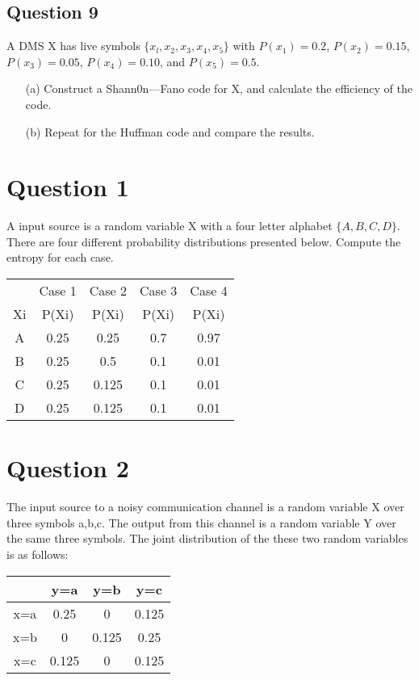 \documentclass[a4paper,12pt]{article}
\begin{document}
\subsection*{Question 9}
A DMS X has live symbols $\{x_l,x_2,x_3,x_4,x_5\}$ with $P(x_1) = 0.2$, $P(x_2)=0.15$, $P(x_3) =0.05$,
$P(x_4) = 0.10$, and $P(x_5) = 0.5$. 
\begin{itemize}
\item[(a)] Construct a Shann0n—Fano code for X, and calculate the efficiency of the code.
\item[(b)] Repeat for the Huffman code and compare the results.
\end{itemize}

 

\section*{Question 1}

A input source is a random variable X with a four letter alphabet $\{A,B,C,D\}$.
There are four different probability distributions presented below. 
Compute the entropy for each case.

\begin{tabular}{|cc|c|c|c|}
\hline
	&	Case 1	&	Case 2	&	Case 3	&	Case 4	\\	
Xi	&	P(Xi)	&	P(Xi)	&	P(Xi)	&	P(Xi)	\\	\hline
A	&	0.25	&	0.25	&	0.7	&	0.97	\\	\hline
B	&	0.25	&	0.5	&	0.1	&	0.01	\\	\hline
C	&	0.25	&	0.125	&	0.1	&	0.01	\\	\hline
D	&	0.25	&	0.125	&	0.1	&	0.01	\\	\hline
\end{tabular} 


\section{Question 2}

The input source to a noisy communication channel is a random variable X over three symbols a,b,c. The output from this channel is a random variable Y over the same three symbols. The joint distribution of the these two random variables is as follows:

\begin{tabular}{|c|c|c|c|}
\hline	&	y=a	&	y=b	&	y=c	\\	\hline
x=a	&	0.25	&	0	&	0.125	\\	\hline
x=b	&	0	&	0.125	&	0.25	\\	\hline
x=c	&	0.125	&	0	&	0.125	\\	\hline
\end{tabular} 
\end{document}
